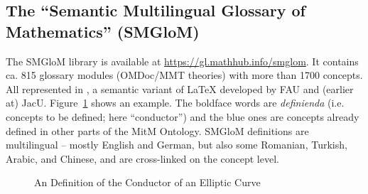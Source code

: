 \subsection{The ``Semantic Multilingual Glossary of Mathematics'' (SMGloM)}\label{sec:smglom}

The SMGloM library is available at \url{https://gl.mathhub.info/smglom}. It contains
ca. 815 glossary modules (OMDoc/MMT theories) with more than 1700 concepts. All
represented in \sTeX, a semantic variant of {\LaTeX} developed by FAU and (earlier at)
JacU. Figure~\ref{fig:conductor} shows an example. The boldface words are \emph{definienda}
(i.e. concepts to be defined; here ``conductor'') and the blue ones are concepts already
defined in other parts of the MitM Ontology. SMGloM definitions are multilingual -- mostly
English and German, but also some Romanian, Turkish, Arabic, and Chinese, and are
cross-linked on the concept level.


\begin{figure}[ht]\centering
  \caption{An \sTeX Definition of the Conductor of an Elliptic
    Curve}\label{fig:conductor}
\end{figure}



